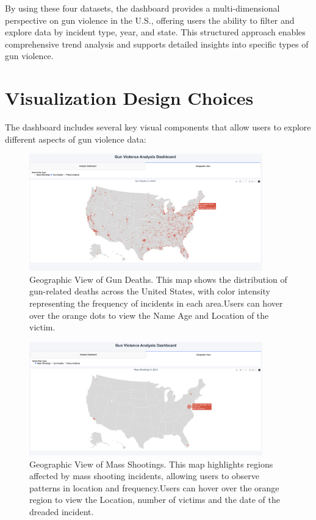 \documentclass{article}
\begin{document}
By using these four datasets, the dashboard provides a multi-dimensional perspective on gun violence in the U.S., offering users the ability to filter and explore data by incident type, year, and state. This structured approach enables comprehensive trend analysis and supports detailed insights into specific types of gun violence.


\section{Visualization Design Choices}
The dashboard includes several key visual components that allow users to explore different aspects of gun violence data:

\begin{figure}[H]
    \centering
    \includegraphics[width=0.9\textwidth]{GunDeaths.png}
    \caption{Geographic View of Gun Deaths. This map shows the distribution of gun-related deaths across the United States, with color intensity representing the frequency of incidents in each area.Users can hover over the orange dots to view the Name Age and Location of the victim.}
    \label{fig:gun_deaths}
\end{figure}

\begin{figure}[H]
    \centering
    \includegraphics[width=0.9\textwidth]{MassShootingGeo.png}
    \caption{Geographic View of Mass Shootings. This map highlights regions affected by mass shooting incidents, allowing users to observe patterns in location and frequency.Users can hover over the orange region to view the Location, number of victims and the date of the dreaded incident.}
    \label{fig:mass_shootings}
\end{figure}
\end{document}
